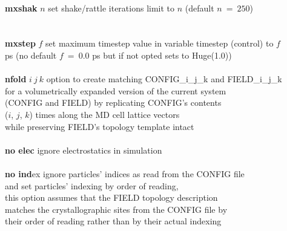 \begin{tabbing}
\>                                              \> \\
\> {\bf mxshak} $n$                             \> set shake/rattle iterations limit to $n$ (default $n~=~250$) \\
\>                                              \> \\
\>                                              \> \\
\> {\bf mxstep} $f$                             \> set maximum timestep value in variable timestep (control) to $f$ \\
\>                                              \> ps (no default $f~=~0.0$ ps but if not opted sets to Huge(1.0)) \\
\>                                              \> \\
\> {\bf nfold} $i~j~k$                          \> option to create matching CONFIG\_i\_j\_k and FIELD\_i\_j\_k \\
\>                                              \> for a volumetrically expanded version of the current system \\
\>                                              \> (CONFIG and FIELD) by replicating CONFIG's contents \\
\>                                              \> ($i$, $j$, $k$) times along the MD cell lattice vectors \\
\>                                              \> while preserving FIELD's topology template intact \\
\>                                              \> \\
\> {\bf no elec}                                \> ignore electrostatics in simulation \\
\>                                              \> \\
\> {\bf no ind}ex                               \> ignore particles' indices as read from the CONFIG file \\
\>                                              \> and set particles' indexing by order of reading, \\
\>                                              \> this option assumes that the FIELD topology description \\
\>                                              \> matches the crystallographic sites from the CONFIG file by \\
\>                                              \> their order of reading rather than by their actual indexing \\

\end{tabbing}
